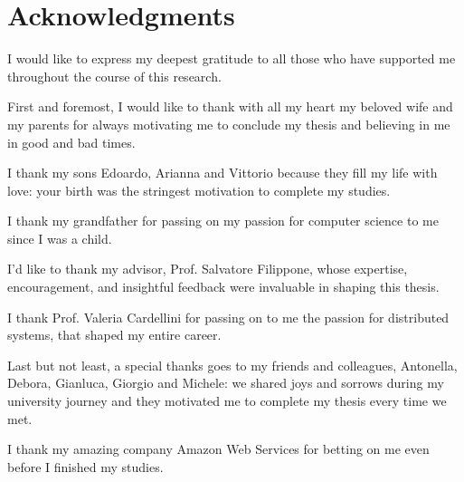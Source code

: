 


\chapter*{Acknowledgments}

I would like to express my deepest gratitude to all those who have supported me throughout the course of this research.

First and foremost, I would like to thank with all my heart my beloved wife and my parents for always motivating me to conclude my thesis and believing in me in good and bad times.

I thank my sons Edoardo, Arianna and Vittorio because they fill my life with love: your birth was the stringest motivation to complete my studies.

I thank my grandfather for passing on my passion for computer science to me since I was a child.

I'd like to thank my advisor, Prof. Salvatore Filippone, whose expertise, encouragement, and insightful feedback were invaluable in shaping this thesis.

I thank Prof. Valeria Cardellini for passing on to me the passion for distributed systems, that shaped my entire career.

Last but not least, a special thanks goes to my friends and colleagues, Antonella, Debora, Gianluca, Giorgio and Michele: we shared joys and sorrows during my university journey and they motivated me to complete my thesis every time we met.

I thank my amazing company Amazon Web Services for betting on me even before I finished my studies.
